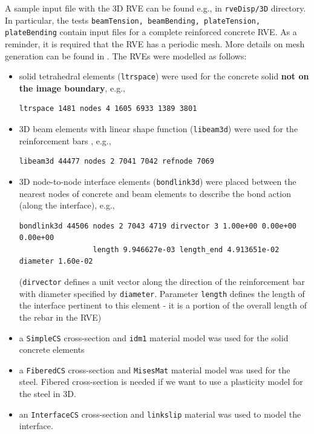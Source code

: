 \documentclass[11pt]{article}
\newcommand{\param}[1]{\texttt{#1}}
\begin{document}
A sample input file with the 3D RVE can be found e.g., in \texttt{rveDisp/3D} directory. In particular, the tests \texttt{beamTension, beamBending, plateTension, plateBending} contain input files for a complete reinforced concrete RVE. As a reminder, it is required that the RVE has a periodic mesh. More details on mesh generation can be found in \cite{PaperE}.
The RVEs were modelled as follows:
\begin{itemize}
    \item solid tetrahedral elements (\texttt{ltrspace}) were used for the concrete solid \textbf{not on the image boundary}, e.g., 
    \begin{lstlisting}[style=oofem, language=oofeminput]
ltrspace 1481 nodes 4 1605 6933 1389 3801 
    \end{lstlisting}
    \item 3D beam elements with linear shape function (\texttt{libeam3d}) were used for the reinforcement bars , e.g.,
    \begin{lstlisting}[style=oofem, language=oofeminput]
libeam3d 44477 nodes 2 7041 7042 refnode 7069
    \end{lstlisting}
    \item 3D node-to-node interface elements (\texttt{bondlink3d}) were placed between the nearest nodes of concrete and beam elements to describe the bond action (along the interface), e.g.,
    \begin{lstlisting}[style=oofem, language=oofeminput]
bondlink3d 44506 nodes 2 7043 4719 dirvector 3 1.00e+00 0.00e+00 0.00e+00 
                 length 9.946627e-03 length_end 4.913651e-02 diameter 1.60e-02    \end{lstlisting}
    (\param{dirvector} defines a unit vector along the direction of the reinforcement bar with diameter specified by \param{diameter}. Parameter \param{length} defines the length of the interface pertinent to this element - it is a portion of the overall length of the rebar in the RVE)
    \item a \texttt{SimpleCS} cross-section and \texttt{idm1} material model was used for the solid concrete elements

    \item a \texttt{FiberedCS} cross-section and \texttt{MisesMat} material model was used for the steel. Fibered cross-section is needed if we want to use a plasticity model for the steel in 3D.

    \item an \texttt{InterfaceCS} cross-section and \texttt{linkslip} material was used to model the interface.
\end{itemize}
\end{document}
